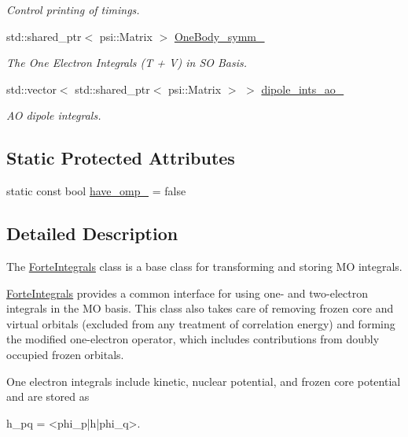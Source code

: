\begin{DoxyCompactItemize}
\begin{DoxyCompactList}\small\item\em Control printing of timings. \end{DoxyCompactList}\item 
std\+::shared\+\_\+ptr$<$ psi\+::\+Matrix $>$ \mbox{\hyperlink{classforte_1_1_forte_integrals_a1a25c318a9230e340e922c14e2c3d07c}{One\+Body\+\_\+symm\+\_\+}}
\begin{DoxyCompactList}\small\item\em The One Electron Integrals (T + V) in SO Basis. \end{DoxyCompactList}\item 
std\+::vector$<$ std\+::shared\+\_\+ptr$<$ psi\+::\+Matrix $>$ $>$ \mbox{\hyperlink{classforte_1_1_forte_integrals_a52fd868c9e9370ab6869abd7ea48a1b4}{dipole\+\_\+ints\+\_\+ao\+\_\+}}
\begin{DoxyCompactList}\small\item\em AO dipole integrals. \end{DoxyCompactList}\end{DoxyCompactItemize}
\subsection*{Static Protected Attributes}
\begin{DoxyCompactItemize}
\item 
static const bool \mbox{\hyperlink{classforte_1_1_forte_integrals_aa239481b0b665b7b4859f3aef4819f41}{have\+\_\+omp\+\_\+}} = false
\end{DoxyCompactItemize}


\subsection{Detailed Description}
The \mbox{\hyperlink{classforte_1_1_forte_integrals}{Forte\+Integrals}} class is a base class for transforming and storing MO integrals. 

\mbox{\hyperlink{classforte_1_1_forte_integrals}{Forte\+Integrals}} provides a common interface for using one-\/ and two-\/electron integrals in the MO basis. This class also takes care of removing frozen core and virtual orbitals (excluded from any treatment of correlation energy) and forming the modified one-\/electron operator, which includes contributions from doubly occupied frozen orbitals.

One electron integrals include kinetic, nuclear potential, and frozen core potential and are stored as \begin{DoxyVerb}h_pq = <phi_p|h|phi_q>.
\end{DoxyVerb}


